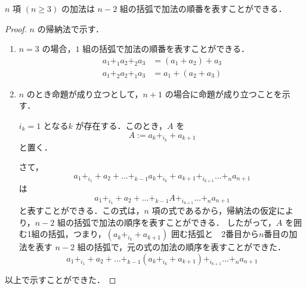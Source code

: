 \documentclass[leqno,autodetect-engine, dvipdfmx-if-dvi,ja=standard]{bxjsarticle}
\begin{document}
	\begin{thm} $n$ 項 $(n \ge 3)$ の加法は $n-2$ 組の括弧で加法の順番を表すことができる．
	\end{thm}
	\begin{proof} $n$ の帰納法で示す．
		\begin{enumerate}
			\item $n=3$ の場合，$1$ 組の括弧で加法の順番を表すことができる．
				\begin{align}
					a_1 +_1 a_2 +_2 a_3 &= (a_1 + a_2) + a_3 \\
					a_1 +_2 a_2 +_1 a_3 &= a_1 + (a_2 + a_3)
				\end{align}
			\item $n$ のとき命題が成り立つとして，$n+1$ の場合に命題が成り立つことを示す．

				$i_k=1$ となる$k$ が存在する．このとき，$A$ を
				\[
				A := a_k +_{i_k} + a_{k+1}
				\]
				と置く．

				さて，
				\[
					a_1 +_{i_1} + a_2 + \dots +_{k-1} a_k +_{i_k} + a_{k+1} +_{i_{k+1}} \dots +_n a_{n+1}
				\]
				は
				\[
					a_1 +_{i_1} + a_2 + \dots +_{k-1} A +_{i_{k+1}} \dots +_n a_{n+1}
				\]
				と表すことができる．この式は，$n$ 項の式であるから，帰納法の仮定により，$n-2$ 組の括弧で加法の順序を表すことができる．
				したがって，$A$ を囲む1組の括弧，つまり，$(a_k +_{i_k} + a_{k+1})$ 囲む括弧と　2番目から$n$番目の加法を表す $n-2$ 組の括弧で，元の式の加法の順序を表すことができた．
				\[
					a_1 +_{i_1} + a_2 + \dots +_{k-1} (a_k +_{i_k} + a_{k+1}) +_{i_{k+1}} \dots +_n a_{n+1}
				\]
		\end{enumerate}
	以上で示すことができた．
	\end{proof}
\end{document}
